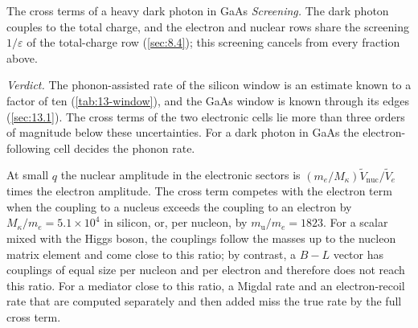 \begin{workedexample}{The cross terms of a heavy dark photon in GaAs}
\emph{Screening.} The dark photon couples to the total charge, and the electron and nuclear rows share the screening $1/\varepsilon$ of the total-charge row (\cref{sec:8.4}); this screening cancels from every fraction above.

\emph{Verdict.} The phonon-assisted rate of the silicon window is an estimate known to a factor of ten (\cref{tab:13-window}), and the GaAs window is known through its edges (\cref{sec:13.1}). The cross terms of the two electronic cells lie more than three orders of magnitude below these uncertainties. For a dark photon in GaAs the electron-following cell decides the phonon rate.
\end{workedexample}

At small $q$ the nuclear amplitude in the electronic sectors is $(m_e/M_\kappa)\tilde V_{\mathrm{nuc}}/\tilde V_e$ times the electron amplitude. The cross term competes with the electron term when the coupling to a nucleus exceeds the coupling to an electron by $M_\kappa/m_e = 5.1\times10^4$ in silicon, or, per nucleon, by $m_{\mathrm{u}}/m_e = 1823$. For a scalar mixed with the Higgs boson, the couplings follow the masses up to the nucleon matrix element and come close to this ratio; by contrast, a $B - L$ vector has couplings of equal size per nucleon and per electron and therefore does not reach this ratio. For a mediator close to this ratio, a Migdal rate and an electron-recoil rate that are computed separately and then added miss the true rate by the full cross term.
